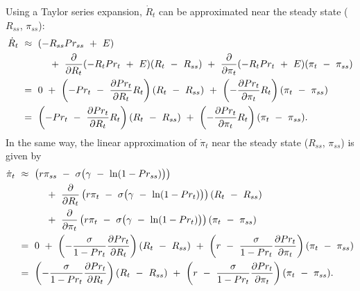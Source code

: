 Using a Taylor series expansion, $\dot{R}_{t}$ can be approximated near the steady state ($R_{ss}$, $\pi_{ss}$):
\begin{equation*}
\begin{split}
    \dot{R}_{t} \ 
    & \approx \ (-R_{ss} Pr_{ss} \ + \ E) \\
    & \hspace{1.0cm} + \ \frac{\partial}{\partial R_{t}} (-R_{t} Pr_{t} \ + \ E) (R_{t} \ - \ R_{ss}) \ + \ \frac{\partial}{\partial \pi_{t}} (-R_{t} Pr_{t} \ + \ E) (\pi_{t} \ - \ \pi_{ss}) \\
    & = \ 0 \ + \ \left( -Pr_{t} \ - \ \frac{\partial Pr_{t}}{\partial R_{t}} R_{t} \right) (R_{t} \ - \ R_{ss}) \ + \ \left( -\frac{\partial Pr_{t}}{\partial \pi_{t}} R_{t} \right) (\pi_{t} \ - \ \pi_{ss}) \\
    & = \ \left( -Pr_{t} \ - \ \frac{\partial Pr_{t}}{\partial R_{t}} R_{t} \right) (R_{t} \ - \ R_{ss}) \ + \ \left( -\frac{\partial Pr_{t}}{\partial \pi_{t}} R_{t} \right) (\pi_{t} \ - \ \pi_{ss}).
\end{split}
\end{equation*}
In the same way, the linear approximation of $\dot{\pi}_{t}$ near the steady state ($R_{ss}$, $\pi_{ss}$) is given by
\begin{equation*}
\begin{split}
    \dot{\pi}_{t} \ 
    & \approx \ \left(r \pi_{ss} \ - \ \sigma \big( \gamma \ - \ \ln(1 - Pr_{ss}) \big) \right) \\
    & \hspace{1.0cm} + \ \frac{\partial}{\partial R_{t}} \left(r \pi_{t} \ - \ \sigma \big( \gamma \ - \ \ln(1 - Pr_{t}) \big) \right) (R_{t} \ - \ R_{ss}) \\
    & \hspace{1.0cm} + \ \frac{\partial}{\partial \pi_{t}} \left(r \pi_{t} \ - \ \sigma \big( \gamma \ - \ \ln(1 - Pr_{t}) \big) \right) (\pi_{t} \ - \ \pi_{ss}) \\
    & = \ 0 \ + \ \left( -\frac{\sigma}{1 - Pr_{t}} \frac{\partial Pr_{t}}{\partial R_{t}} \right) (R_{t} \ - \ R_{ss}) \ + \ \left( r \ - \ \frac{\sigma}{1 - Pr_{t}} \frac{\partial Pr_{t}}{\partial \pi_{t}} \right) (\pi_{t} \ - \ \pi_{ss}) \\
    & = \ \left( -\frac{\sigma}{1 - Pr_{t}} \frac{\partial Pr_{t}}{\partial R_{t}} \right) (R_{t} \ - \ R_{ss}) \ + \ \left( r \ - \ \frac{\sigma}{1 - Pr_{t}} \frac{\partial Pr_{t}}{\partial \pi_{t}} \right) (\pi_{t} \ - \ \pi_{ss}).
\end{split}
\end{equation*}
